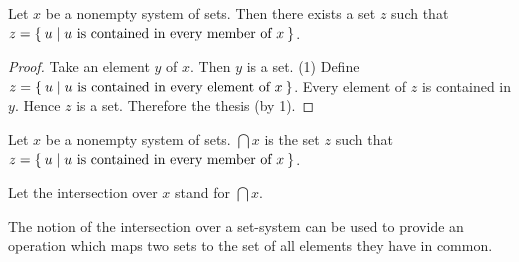 \documentclass[../../set-theory.tex]{subfiles}
\begin{document}
  \begin{forthel}
    \begin{lemma}
      Let $x$ be a nonempty system of sets.
      Then there exists a set $z$ such that $z = \Set{u | \text{$u$ is contained in every member of $x$}}$.
    \end{lemma}
    \begin{proof}
      Take an element $y$ of $x$.
      Then $y$ is a set.
      (1) Define $z = \Set{u | \text{$u$ is contained in every element of $x$}}$.
      Every element of $z$ is contained in $y$.
      Hence $z$ is a set.
      Therefore the thesis (by 1).
    \end{proof}

    \begin{definition}
      Let $x$ be a nonempty system of sets.
      $\bigcap x$ is the set $z$ such that $z = \Set{u | \text{$u$ is contained in every member of $x$}}$.
    \end{definition}

    Let the intersection over $x$ stand for $\bigcap x$.
  \end{forthel}

  \noindent The notion of the intersection over a set-system can be used to
  provide an operation which maps two sets to the set of all elements they have
  in common.
\end{document}

